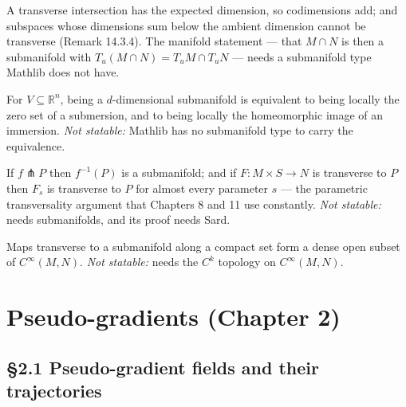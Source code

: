 \begin{theorem}
  \label{thm:14.3.1}
  \leanok
  A transverse intersection has the expected dimension, so codimensions add; and
  subspaces whose dimensions sum below the ambient dimension cannot be
  transverse (Remark 14.3.4).  The manifold statement --- that $M\cap N$ is then
  a submanifold with $T_u(M\cap N) = T_uM\cap T_uN$ --- needs a submanifold type
  Mathlib does not have.
\end{theorem}

\begin{theorem}
  \label{thm:14.1.1}
  \notready
  For $V \subseteq \mathbb{R}^n$, being a $d$-dimensional submanifold is
  equivalent to being locally the zero set of a submersion, and to being locally
  the homeomorphic image of an immersion.
  \emph{Not statable:} Mathlib has no submanifold type to carry the equivalence.
\end{theorem}

\begin{proposition}
  \label{prop:14.3.5}
  \notready
  If $f \pitchfork P$ then $f^{-1}(P)$ is a submanifold; and if
  $F\colon M\times S\to N$ is transverse to $P$ then $F_s$ is transverse to $P$
  for almost every parameter $s$ --- the parametric transversality argument that
  Chapters 8 and 11 use constantly.
  \emph{Not statable:} needs submanifolds, and its proof needs Sard.
\end{proposition}

\begin{theorem}
  \label{thm:14.3.11}
  \notready
  Maps transverse to a submanifold along a compact set form a dense open subset
  of $C^\infty(M,N)$.
  \emph{Not statable:} needs the $C^k$ topology on $C^\infty(M,N)$.
\end{theorem}

\chapter{Pseudo-gradients (Chapter 2)}

\section{\S2.1 Pseudo-gradient fields and their trajectories}

